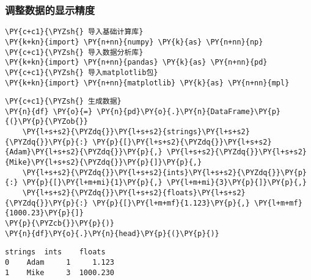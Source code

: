     \hypertarget{ux8c03ux6574ux6570ux636eux7684ux663eux793aux7cbeux5ea6}{%
\subsubsection{调整数据的显示精度}\label{ux8c03ux6574ux6570ux636eux7684ux663eux793aux7cbeux5ea6}}

    \begin{tcolorbox}[breakable, size=fbox, boxrule=1pt, pad at break*=1mm,colback=cellbackground, colframe=cellborder]
\begin{Verbatim}[commandchars=\\\{\}]
\PY{c+c1}{\PYZsh{} 导入基础计算库}
\PY{k+kn}{import} \PY{n+nn}{numpy} \PY{k}{as} \PY{n+nn}{np}
\PY{c+c1}{\PYZsh{} 导入数据分析库}
\PY{k+kn}{import} \PY{n+nn}{pandas} \PY{k}{as} \PY{n+nn}{pd}
\PY{c+c1}{\PYZsh{} 导入matplotlib包}
\PY{k+kn}{import} \PY{n+nn}{matplotlib} \PY{k}{as} \PY{n+nn}{mpl}
\end{Verbatim}
\end{tcolorbox}

    \begin{tcolorbox}[breakable, size=fbox, boxrule=1pt, pad at break*=1mm,colback=cellbackground, colframe=cellborder]
\begin{Verbatim}[commandchars=\\\{\}]
\PY{c+c1}{\PYZsh{} 生成数据}
\PY{n}{df} \PY{o}{=} \PY{n}{pd}\PY{o}{.}\PY{n}{DataFrame}\PY{p}{(}\PY{p}{\PYZob{}}
    \PY{l+s+s2}{\PYZdq{}}\PY{l+s+s2}{strings}\PY{l+s+s2}{\PYZdq{}}\PY{p}{:} \PY{p}{[}\PY{l+s+s2}{\PYZdq{}}\PY{l+s+s2}{Adam}\PY{l+s+s2}{\PYZdq{}}\PY{p}{,} \PY{l+s+s2}{\PYZdq{}}\PY{l+s+s2}{Mike}\PY{l+s+s2}{\PYZdq{}}\PY{p}{]}\PY{p}{,}
    \PY{l+s+s2}{\PYZdq{}}\PY{l+s+s2}{ints}\PY{l+s+s2}{\PYZdq{}}\PY{p}{:} \PY{p}{[}\PY{l+m+mi}{1}\PY{p}{,} \PY{l+m+mi}{3}\PY{p}{]}\PY{p}{,}
    \PY{l+s+s2}{\PYZdq{}}\PY{l+s+s2}{floats}\PY{l+s+s2}{\PYZdq{}}\PY{p}{:} \PY{p}{[}\PY{l+m+mf}{1.123}\PY{p}{,} \PY{l+m+mf}{1000.23}\PY{p}{]}
\PY{p}{\PYZcb{}}\PY{p}{)}
\PY{n}{df}\PY{o}{.}\PY{n}{head}\PY{p}{(}\PY{p}{)}
\end{Verbatim}
\end{tcolorbox}

            \begin{tcolorbox}[breakable, size=fbox, boxrule=.5pt, pad at break*=1mm, opacityfill=0]
\begin{Verbatim}[commandchars=\\\{\}]
  strings  ints    floats
0    Adam     1     1.123
1    Mike     3  1000.230
\end{Verbatim}
\end{tcolorbox}
        
